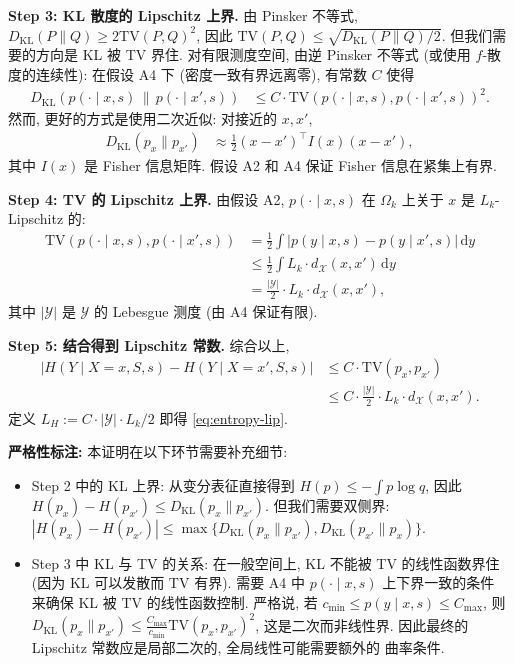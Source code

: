 \documentclass[12pt,a4paper]{article}
\newcommand{\cX}{\mathcal{X}}
\newcommand{\cY}{\mathcal{Y}}
\newcommand{\TV}{\mathrm{TV}}
\newcommand{\KL}{D_{\mathrm{KL}}}
\newcommand{\annotation}{\medskip\noindent\textbf{严格性标注: }}
\begin{document}
\textbf{Step 3: KL 散度的 Lipschitz 上界.}
由 Pinsker 不等式, $\KL(P\|Q)\geq 2\TV(P,Q)^2$,
因此 $\TV(P,Q)\leq\sqrt{\KL(P\|Q)/2}$.
但我们需要的方向是 KL 被 TV 界住. 对有限测度空间,
由逆 Pinsker 不等式 (或使用 $f$-散度的连续性):
在假设 A4 下 (密度一致有界远离零),
有常数 $C$ 使得
\begin{align*}
    \KL(p(\cdot\mid x,s)\,\|\,p(\cdot\mid x',s))
    &\leq C\cdot \TV(p(\cdot\mid x,s),p(\cdot\mid x',s))^2.
\end{align*}
然而, 更好的方式是使用二次近似: 对接近的 $x,x'$,
\begin{align*}
    \KL(p_x\|p_{x'}) &\approx \frac12 (x-x')^\top I(x) (x-x'),
\end{align*}
其中 $I(x)$ 是 Fisher 信息矩阵. 假设 A2 和 A4 保证
Fisher 信息在紧集上有界.

\textbf{Step 4: TV 的 Lipschitz 上界.}
由假设 A2, $p(\cdot\mid x,s)$ 在 $\Omega_k$ 上关于 $x$
是 $L_k$-Lipschitz 的:
\begin{align*}
    \TV(p(\cdot\mid x,s),p(\cdot\mid x',s))
    &= \frac12\int |p(y\mid x,s)-p(y\mid x',s)|\,\mathrm{d}y \\
    &\leq \frac12\int L_k\cdot d_{\cX}(x,x')\,\mathrm{d}y \\
    &= \frac{|\cY|}{2}\cdot L_k\cdot d_{\cX}(x,x'),
\end{align*}
其中 $|\cY|$ 是 $\cY$ 的 Lebesgue 测度 (由 A4 保证有限).

\textbf{Step 5: 结合得到 Lipschitz 常数.}
综合以上,
\begin{align*}
    |H(Y\mid X=x,S,s)-H(Y\mid X=x',S,s)|
    &\leq C\cdot \TV(p_x,p_{x'}) \\
    &\leq C\cdot\frac{|\cY|}{2}\cdot L_k\cdot d_{\cX}(x,x').
\end{align*}
定义 $L_H := C\cdot|\cY|\cdot L_k/2$ 即得 \eqref{eq:entropy-lip}.
\checkmark

\medskip\noindent
\annotation 本证明在以下环节需要补充细节:
\begin{itemize}
    \item Step 2 中的 KL 上界: 从变分表征直接得到
          $H(p)\leq -\int p\log q$, 因此
          $H(p_x)-H(p_{x'})\leq \KL(p_x\|p_{x'})$.
          但我们需要双侧界: $|H(p_x)-H(p_{x'})|
          \leq \max\{\KL(p_x\|p_{x'}),\KL(p_{x'}\|p_x)\}$.
    \item Step 3 中 KL 与 TV 的关系: 在一般空间上,
          KL 不能被 TV 的线性函数界住 (因为 KL 可以发散而 TV
          有界). 需要 A4 中 $p(\cdot\mid x,s)$ 上下界一致的条件
          来确保 KL 被 TV 的线性函数控制. 严格说, 若
          $c_{\min}\leq p(y\mid x,s)\leq C_{\max}$, 则
          $\KL(p_x\|p_{x'})\leq \frac{C_{\max}}{c_{\min}}
          \TV(p_x,p_{x'})^2$, 这是二次而非线性界. 因此最终的
          Lipschitz 常数应是局部二次的, 全局线性可能需要额外的
          曲率条件.
\end{itemize}
\end{document}
